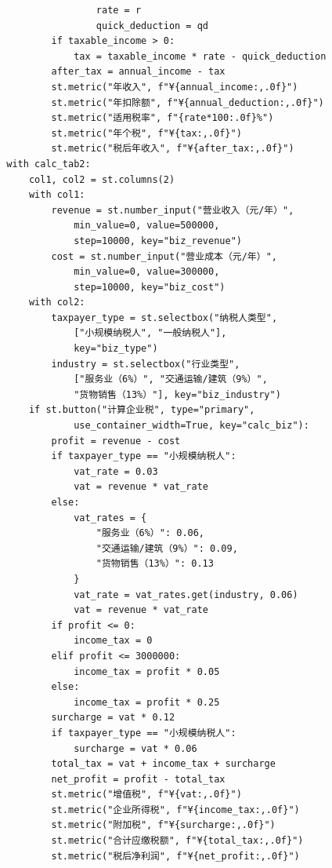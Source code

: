 \documentclass[a4paper,10pt]{article}
\begin{document}
\begin{lstlisting}
                        rate = r
                        quick_deduction = qd
                if taxable_income > 0:
                    tax = taxable_income * rate - quick_deduction
                after_tax = annual_income - tax
                st.metric("年收入", f"¥{annual_income:,.0f}")
                st.metric("年扣除额", f"¥{annual_deduction:,.0f}")
                st.metric("适用税率", f"{rate*100:.0f}%")
                st.metric("年个税", f"¥{tax:,.0f}")
                st.metric("税后年收入", f"¥{after_tax:,.0f}")
        with calc_tab2:
            col1, col2 = st.columns(2)
            with col1:
                revenue = st.number_input("营业收入（元/年）",
                    min_value=0, value=500000,
                    step=10000, key="biz_revenue")
                cost = st.number_input("营业成本（元/年）",
                    min_value=0, value=300000,
                    step=10000, key="biz_cost")
            with col2:
                taxpayer_type = st.selectbox("纳税人类型",
                    ["小规模纳税人", "一般纳税人"],
                    key="biz_type")
                industry = st.selectbox("行业类型",
                    ["服务业（6%）", "交通运输/建筑（9%）",
                    "货物销售（13%）"], key="biz_industry")
            if st.button("计算企业税", type="primary",
                    use_container_width=True, key="calc_biz"):
                profit = revenue - cost
                if taxpayer_type == "小规模纳税人":
                    vat_rate = 0.03
                    vat = revenue * vat_rate
                else:
                    vat_rates = {
                        "服务业（6%）": 0.06,
                        "交通运输/建筑（9%）": 0.09,
                        "货物销售（13%）": 0.13
                    }
                    vat_rate = vat_rates.get(industry, 0.06)
                    vat = revenue * vat_rate
                if profit <= 0:
                    income_tax = 0
                elif profit <= 3000000:
                    income_tax = profit * 0.05
                else:
                    income_tax = profit * 0.25
                surcharge = vat * 0.12
                if taxpayer_type == "小规模纳税人":
                    surcharge = vat * 0.06
                total_tax = vat + income_tax + surcharge
                net_profit = profit - total_tax
                st.metric("增值税", f"¥{vat:,.0f}")
                st.metric("企业所得税", f"¥{income_tax:,.0f}")
                st.metric("附加税", f"¥{surcharge:,.0f}")
                st.metric("合计应缴税额", f"¥{total_tax:,.0f}")
                st.metric("税后净利润", f"¥{net_profit:,.0f}")
\end{lstlisting}
\end{document}
